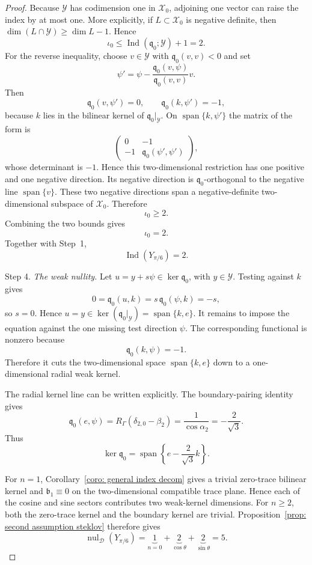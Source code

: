 \documentclass[10pt,a4paper]{amsart}
\begin{document}
\begin{proof}
Because $\mathcal Y$ has codimension one in $\mathcal X_0$, adjoining one vector can raise the index by at most one. More explicitly, if $L\subset\mathcal X_0$ is negative definite, then $\dim(L\cap\mathcal Y)\ge\dim L-1$. Hence
\[
\iota_0\le
\operatorname{Ind}(\mathfrak q_0;\mathcal Y)+1=2.
\]
For the reverse inequality, choose $v\in\mathcal Y$ with $\mathfrak q_0(v,v)<0$ and set
\[
\psi'
=\psi-
\frac{\mathfrak q_0(v,\psi)}{\mathfrak q_0(v,v)}v.
\]
Then
\[
\mathfrak q_0(v,\psi')=0,
\qquad
\mathfrak q_0(k,\psi')=-1,
\]
because $k$ lies in the bilinear kernel of $\mathfrak q_0|_{\mathcal Y}$. On $\operatorname{span}\{k,\psi'\}$ the matrix of the form is
\[
\begin{pmatrix}
0&-1\\
-1&\mathfrak q_0(\psi',\psi')
\end{pmatrix},
\]
whose determinant is $-1$. Hence this two-dimensional restriction has one positive and one negative direction. Its negative direction is $\mathfrak q_0$-orthogonal to the negative line $\operatorname{span}\{v\}$. These two negative directions span a negative-definite two-dimensional subspace of $\mathcal X_0$. Therefore
\[
\iota_0\ge2.
\]
Combining the two bounds gives
\[
\iota_0=2.
\]
Together with Step~1,
\[
\operatorname{Ind}(Y_{\pi/6})=2.
\]

\medskip
\noindent Step 4. \emph{The weak nullity.}
Let $u=y+s\psi\in\ker\mathfrak q_0$, with $y\in\mathcal Y$. Testing against $k$ gives
\[
0=\mathfrak q_0(u,k)
=s\,\mathfrak q_0(\psi,k)=-s,
\]
so $s=0$. Hence $u=y\in\ker(\mathfrak q_0|_{\mathcal Y})=\operatorname{span}\{k,e\}$. It remains to impose the equation against the one missing test direction $\psi$. The corresponding functional is nonzero because
\[
\mathfrak q_0(k,\psi)=-1.
\]
Therefore it cuts the two-dimensional space $\operatorname{span}\{k,e\}$ down to a one-dimensional radial weak kernel.

The radial kernel line can be written explicitly. The boundary-pairing identity gives
\[
\mathfrak q_0(e,\psi)
=R_\Gamma(\delta_{2,0}-\beta_2)
=\frac{1}{\cos\alpha_2}
=-\frac{2}{\sqrt3}.
\]
Thus
\[
\ker\mathfrak q_0
=\operatorname{span}\left\{e-\frac{2}{\sqrt3}k\right\}.
\]

For $n=1$, Corollary~\ref{coro: general index decom} gives a trivial zero-trace bilinear kernel and $\mathfrak b_1\equiv0$ on the two-dimensional compatible trace plane. Hence each of the cosine and sine sectors contributes two weak-kernel dimensions. For $n\ge2$, both the zero-trace kernel and the boundary kernel are trivial. Proposition~\ref{prop: second assumption steklov} therefore gives
\[
\operatorname{nul}_{\mathcal D}(Y_{\pi/6})
=\underbrace{1}_{n=0}
+\underbrace{2}_{\cos\theta}
+\underbrace{2}_{\sin\theta}
=5.
\]
\end{proof}
\end{document}
